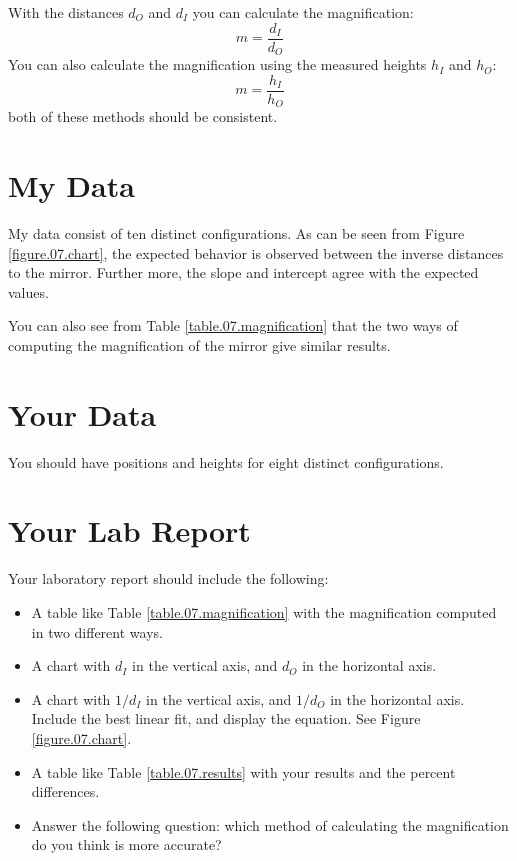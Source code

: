 With the distances $d_{O}$ and $d_{I}$ you can calculate the magnification:
\begin{equation}
    m = \frac{d_{I}}{d_{O}}
\end{equation}
You can also calculate the magnification using the measured heights $h_{I}$ and $h_{O}$:
\begin{equation}
    m = \frac{h_{I}}{h_{O}}
\end{equation}
both of these methods should be consistent.
%
\section{My Data}
%
My data consist of ten distinct configurations. As can be seen from Figure \ref{figure.07.chart}, the expected behavior is observed between the inverse distances to the mirror. Further more, the slope and intercept agree with the expected values.

You can also see from Table \ref{table.07.magnification} that the two ways of computing the magnification of the mirror give similar results.
%
\section{Your Data}
%
You should have positions and heights for eight distinct configurations.
%
\newpage
\section{Your Lab Report}
%
Your laboratory report should include the following:
\begin{itemize}
    \item A table like Table \ref{table.07.magnification} with the magnification computed in two different ways.
    \item A chart with $d_{I}$ in the vertical axis, and $d_{O}$ in the horizontal axis.
    \item A chart with $1/d_{I}$ in the vertical axis, and $1/d_{O}$ in the horizontal axis. Include the best linear fit, and display the equation. See Figure \ref{figure.07.chart}.
    \item A table like Table \ref{table.07.results} with your results and the percent differences.
    \item Answer the following question: which method of calculating the magnification do you think is more accurate?
\end{itemize}
%
\newpage
